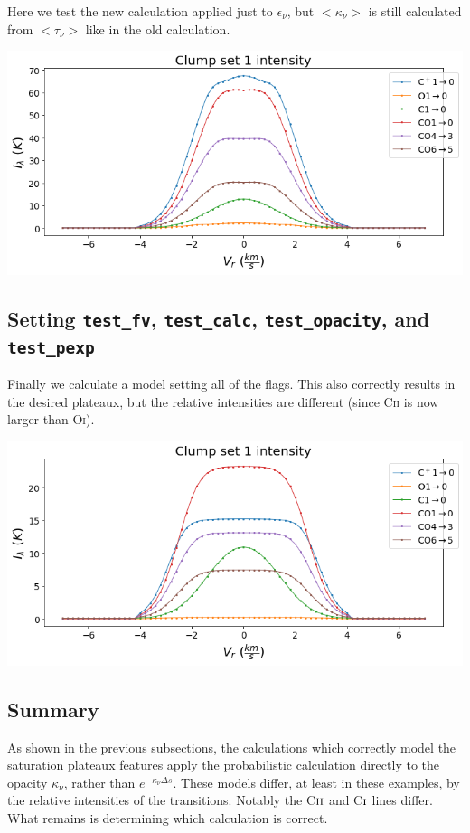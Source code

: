\documentclass[a4paper]{article}
\newcommand{\mathsc}[1]{{\normalfont\textsc{#1}}}
\begin{document}
    Here we test the new calculation applied just to \(\epsilon_\nu\), but \(<\kappa_\nu>\) is still calculated from \(<\tau_\nu>\) like in the old calculation.

    \includegraphics*[width=\linewidth]{voxel_error_fv-calc-opacity.png}

    \pagebreak

    \subsection{Setting \texttt{test\_fv}, \texttt{test\_calc}, \texttt{test\_opacity}, and \texttt{test\_pexp}}

    Finally we calculate a model setting all of the flags.
    This also correctly results in the desired plateaux, but the relative intensities are different (since C\textsc{ii} is now larger than O\textsc{i}).

    \includegraphics*[width=\linewidth]{voxel_error_fv-calc-opacity-pexp.png}

    \subsection{Summary}

    As shown in the previous subsections, the calculations which correctly model the saturation plateaux features apply the probabilistic calculation directly to the opacity \(\kappa_\nu\), rather than \(e^{-\kappa_\nu \Delta s}\).
    These models differ, at least in these examples, by the relative intensities of the transitions.
    Notably the C\(\mathsc{ii}\) and C\(\mathsc{i}\) lines differ.
    What remains is determining which calculation is correct.
\end{document}
